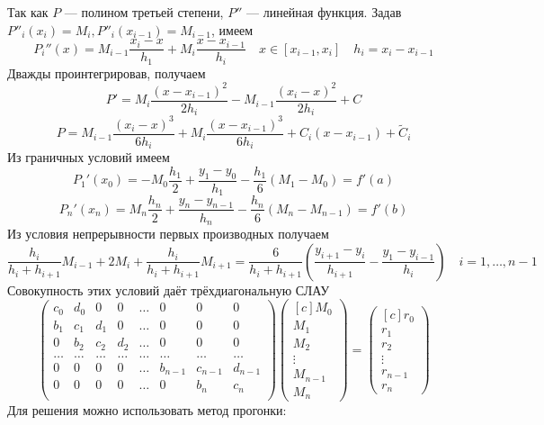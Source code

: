 \documentclass[a4paper]{article}
\begin{document}
Так как \(P\) --- полином третьей степени, \(P''\) --- линейная функция. Задав
\(P''_{i}(x_{i}) = M_{i},P''_{i}(x_{i-1}) = M_{i-1}\), имеем \[
  P_{i}''(x) = M_{i-1} \frac{x_{i}-x}{h_{1}} + M_{i} \frac{x-x_{i-1}}{h_{i}} \quad x \in [x_{i-1},x_{i}] \quad h_{i} = x_{i} - x_{i-1}
\]
Дважды проинтегрировав, получаем \[
  P' = M_{i} \frac{(x-x_{i-1})^2}{2h_{i}} - M_{i-1} \frac{(x_{i}-x)^2}{2h_{i}} + C
\]\[
  P = M_{i-1} \frac{(x_{i}-x)^{3}}{6h_{i}} + M_{i} \frac{(x-x_{i-1})^{3}}{6h_{i}} + C_{i}(x-x_{i-1}) + \tilde{C}_{i}
\]
Из граничных условий имеем \[
  P_{1}'(x_{0}) = -M_{0} \frac{h_1}{2} + \frac{y_1-y_0}{h_1} - \frac{h_1}{6}\left(M_1-M_0\right) = f'(a)
\]\[
  P_{n}'(x_{n}) = M_{n} \frac{h_{n}}{2} + \frac{y_{n}-y_{n-1}}{h_{n}} - \frac{h_{n}}{6} \left( M_{n} - M_{n-1} \right) = f'(b)
\]
Из условия непрерывности первых производных получаем \[
  \frac{h_{i}}{h_{i}+h_{i+1}} M_{i-1} + 2M_{i} + \frac{h_{i}}{h_{i}+h_{i+1}}M_{i+1} =
  \frac{6}{h_{i}+h_{i+1}}\left( \frac{y_{i+1}-y_{i}}{h_{i+1}} - \frac{y_{1}-y_{i-1}}{h_{i}}\right) \quad i = 1,\ldots,n-1
\]
Совокупность этих условий даёт трёхдиагональную СЛАУ \[
\begin{pmatrix}
  c_0 & d_0 & 0 & 0 & \ldots & 0 & 0 & 0\\
  b_1 & c_1 & d_1 & 0 & \ldots & 0 & 0 & 0\\
  0 & b_2 & c_2 & d_2 & \ldots & 0 & 0 & 0\\
  \ldots & \ldots & \ldots & \ldots & \ldots & \ldots & \ldots & \ldots\\
  0 & 0 & 0 & 0& \ldots &b_{n-1} & c_{n-1} & d_{n-1}\\
  0 & 0 & 0 & 0 & \ldots & 0 & b_n & c_n \\
\end{pmatrix}
\begin{pmatrix}[c]
  M_0 \\ M_1 \\ M_2 \\ \vdots \\ M_{n-1} \\ M_{n}
\end{pmatrix}
= \begin{pmatrix}[c]
    r_0 \\ r_1 \\ r_2 \\ \vdots \\ r_{n-1} \\ r_{n}
  \end{pmatrix}
\]
Для решения можно использовать метод прогонки:
\end{document}
